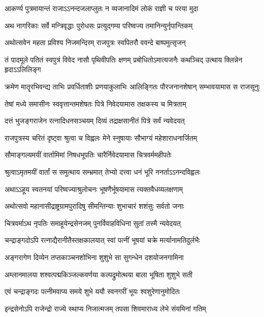 \begin{center}
\twolineshloka
{आकर्ण्य पुत्रमायान्तं राजाऽऽनन्दजलाप्लुतः}
{न व्यजानादिमं लोकं राज्ञी च परया मुदा} %

\twolineshloka
{अथ नागरिकाः सर्वे मन्त्रिवृद्धाः पुरोधसः}
{प्रत्युद्गम्य परिष्वज्य तमानिन्युर्नृपान्तिकम्} %

\twolineshloka
{अथोत्सवेन महता प्रविश्य निजमन्दिरम्}
{राजपुत्रः स्वपितरौ ववन्दे बाष्पमुत्सृजन्} %

\fourlineindentedshloka
{तं पादमूले पतितं स्वपुत्रं}
{विवेद नासौ पृथिवीपतिः क्षणम्}
{प्रबोधितोऽमात्यजनैः कथञ्चिद्}
{उत्थाय क्लिन्नेन हृदाऽऽलिलिङ्ग} %

\fourlineindentedshloka
{क्रमेण मातॄरभिवन्द्य ताभिः}
{प्रवर्धिताशीः प्रणयाकुलाभिः}
{आलिङ्गितः पौरजनानशेषान्}
{सम्भावयामास स राजसूनुः} %

\twolineshloka
{तेषां मध्ये समासीनः स्ववृत्तान्तमशेषतः}
{पित्रे निवेदयामास तक्षकस्य च मित्रताम्} %

\twolineshloka
{दत्तं भुजङ्गराजेन रत्नादिधनसञ्चयम्}
{दिव्यं तद्राक्षसानीतं पित्रे सर्वं न्यवेदयत्} %

\twolineshloka
{राजपुत्रस्य चरितं दृष्ट्वा श्रुत्वा च विह्वलः}
{मेने स्नुषायाः सौभाग्यं महेशाराधनार्जितम्} %

\twolineshloka
{सौमाङ्गल्यमयीं वार्तामिमां निषधभूपतिः}
{चारैर्निवेदयामास चित्रवर्ममहीपतेः} %

\twolineshloka
{श्रुत्वाऽमृतमयीं वार्तां स समुत्थाय सम्भ्रमात्}
{तेभ्यो दत्त्वा धनं भूरि ननर्ताऽऽनन्दविह्वलः} %

\twolineshloka
{अथाऽऽहूय स्वतनयां परिष्वज्याश्रुलोचनः}
{भूषणैर्भूषयामास त्यक्तवैधव्यलक्षणाम्} %

\twolineshloka
{अथोत्सवो महानासीद्राष्ट्रग्रामपुरादिषु}
{सीमन्तिन्याः शुभाचारं शशंसुः सर्वतो जनाः} %

\twolineshloka
{चित्रवर्माऽथ नृपतिः समाहूयेन्द्रसेनजम्}
{पुनर्विवाहविधिना सुतां तस्मै न्यवेदयत्} %

\twolineshloka
{चन्द्राङ्गदोऽपि रत्नाद्यैरानीतैस्तक्षकालयात्}
{स्वां पत्नीं भूषयां चक्रे मर्त्यानामतिदुर्लभैः} %

\twolineshloka
{अङ्गरागेण दिव्येन तप्तकाञ्चनशोभिना}
{शुशुभे सा सुगन्धेन दशयोजनगामिना} %

\twolineshloka
{अम्लानमालया शश्वत्पद्मकिञ्जल्कवर्णया}
{कल्पद्रुमोत्थया बाला भूषिता शुशुभे सती} %

\twolineshloka
{एवं चन्द्राङ्गदः पत्नीमवाप्य समये शुभे}
{ययौ स्वनगरीं भूयः श्वशुरेणानुमोदितः} %

\twolineshloka
{इन्द्रसेनोऽपि राजेन्द्रो राज्ये स्थाप्य निजात्मजम्}
{तपसा शिवमाराध्य लेभे संयमिनां गतिम्} %


\end{center}
